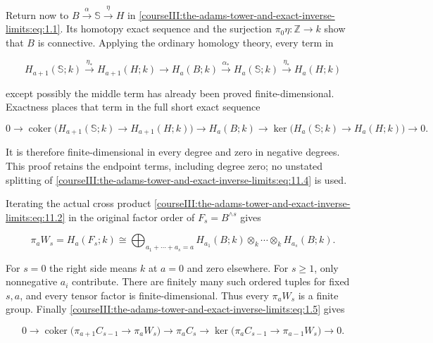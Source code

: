 Return now to \(B\xrightarrow\alpha\mathbb S\xrightarrow\eta H\) in \eqref{courseIII:the-adams-tower-and-exact-inverse-limits:eq:1.1}. Its homotopy exact sequence and the surjection \(\pi_0\eta:\mathbb Z\to k\) show that \(B\) is connective. Applying the ordinary homology theory, every term in

\begin{equation}
H_{a+1}(\mathbb S;k)\xrightarrow{\eta_*}H_{a+1}(H;k)
 \longrightarrow H_a(B;k)
 \xrightarrow{\alpha_*}H_a(\mathbb S;k)
 \xrightarrow{\eta_*}H_a(H;k)
 \label{courseIII:the-adams-tower-and-exact-inverse-limits:eq:11.4}
\end{equation}

except possibly the middle term has already been proved finite-dimensional. Exactness places that term in the full short exact sequence

\begin{equation}
0\longrightarrow
 \operatorname{coker}\bigl(H_{a+1}(\mathbb S;k)\to H_{a+1}(H;k)\bigr)
 \longrightarrow H_a(B;k)
 \longrightarrow
 \ker\bigl(H_a(\mathbb S;k)\to H_a(H;k)\bigr)
 \longrightarrow0.
 \label{courseIII:the-adams-tower-and-exact-inverse-limits:eq:11.5}
\end{equation}

It is therefore finite-dimensional in every degree and zero in negative degrees. This proof retains the endpoint terms, including degree zero; no unstated splitting of \eqref{courseIII:the-adams-tower-and-exact-inverse-limits:eq:11.4} is used.

Iterating the actual cross product \eqref{courseIII:the-adams-tower-and-exact-inverse-limits:eq:11.2} in the original factor order of \(F_s=B^{\wedge s}\) gives

\begin{equation}
\pi_aW_s=H_a(F_s;k)
   \cong
 \bigoplus_{a_1+\cdots+a_s=a}
       H_{a_1}(B;k)\otimes_k\cdots\otimes_k H_{a_s}(B;k).
 \label{courseIII:the-adams-tower-and-exact-inverse-limits:eq:11.6}
\end{equation}

For \(s=0\) the right side means \(k\) at \(a=0\) and zero elsewhere. For \(s\geq1\), only nonnegative \(a_i\) contribute. There are finitely many such ordered tuples for fixed \(s,a\), and every tensor factor is finite-dimensional. Thus every \(\pi_aW_s\) is a finite group. Finally \eqref{courseIII:the-adams-tower-and-exact-inverse-limits:eq:1.5} gives

\begin{equation}
0\longrightarrow
 \operatorname{coker}\bigl(\pi_{a+1}C_{s-1}\to\pi_aW_s\bigr)
 \longrightarrow\pi_aC_s
 \longrightarrow
 \ker\bigl(\pi_aC_{s-1}\to\pi_{a-1}W_s\bigr)
 \longrightarrow0.
 \label{courseIII:the-adams-tower-and-exact-inverse-limits:eq:11.7}
\end{equation}

